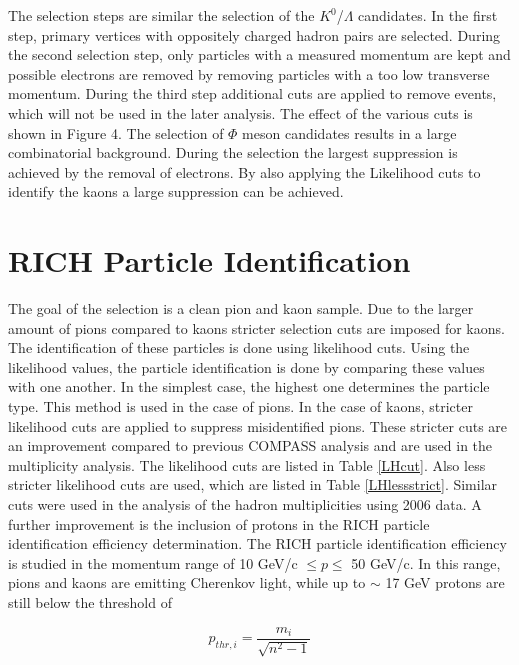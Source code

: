 The selection steps are similar the selection of the $K^0$/$\Lambda$ candidates. In the first step, primary vertices with oppositely charged hadron pairs are selected. During the second selection step, only particles with a measured momentum are kept and possible electrons are removed by removing particles with a too low transverse momentum. During the third step additional cuts are applied to remove events, which will not be used in the later analysis. The effect of the various cuts is shown in Figure 4. The selection of $\Phi$ meson candidates results in a large combinatorial background. During the selection the largest suppression is achieved by the removal of electrons. By also applying the Likelihood cuts to identify the kaons a large suppression can be achieved.

\section{RICH Particle Identification}

The goal of the selection is a clean pion and kaon sample. Due to the larger amount of pions compared to kaons stricter selection cuts are imposed for kaons. The identification of these particles is done using likelihood cuts. Using the likelihood values, the particle identification is done by comparing these values with one another. In the simplest case, the highest one determines the particle type. This method is used in the case of pions. In the case of kaons, stricter likelihood cuts are applied to suppress misidentified pions. These stricter cuts are an improvement compared to previous COMPASS analysis and are used in the multiplicity analysis. The likelihood cuts are listed in Table \ref{LHcut}. Also less stricter likelihood cuts are used, which are listed in Table \ref{LHlessstrict}. Similar cuts were used in the analysis of the hadron multiplicities using 2006 data. A further improvement is the inclusion of protons in the RICH particle identification efficiency determination. The RICH particle identification efficiency is studied in the momentum range of 10 GeV/c $ \leq p \leq $ 50 GeV/c. In this range, pions and kaons are emitting Cherenkov light, while up to $\sim$ 17 GeV protons are still below the threshold of

\begin{equation}
  p_{thr,i} = \frac{m_i}{ \sqrt{n^{2}-1} }
\end{equation}

